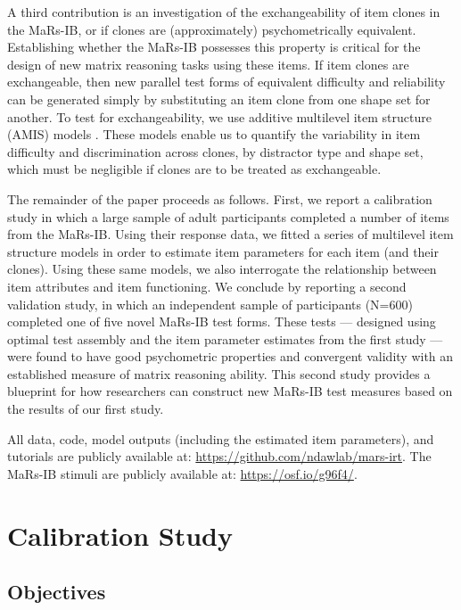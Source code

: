 \documentclass[a4paper,man,natbib,noextraspace]{apa6}
\begin{document}
A third contribution is an investigation of the exchangeability of item clones in the MaRs-IB, or if clones are (approximately) psychometrically equivalent. Establishing whether the MaRs-IB possesses this property is critical for the design of new matrix reasoning tasks using these items. If item clones are exchangeable, then new parallel test forms of equivalent difficulty and reliability can be generated simply by substituting an item clone from one shape set for another. To test for exchangeability, we use additive multilevel item structure (AMIS) models \citep{geerlings2011modeling, cho2014additive, lathrop2017item}. These models enable us to quantify the variability in item difficulty and discrimination across clones, by distractor type and shape set, which must be negligible if clones are to be treated as exchangeable. 

The remainder of the paper proceeds as follows. First, we report a calibration study in which a large sample of adult participants completed a number of items from the MaRs-IB. Using their response data, we fitted a series of multilevel item structure models in order to estimate item parameters for each item (and their clones). Using these same models, we also interrogate the relationship between item attributes and item functioning. We conclude by reporting a second validation study, in which an independent sample of participants (N=600) completed one of five novel MaRs-IB test forms. These tests --- designed using optimal test assembly and the item parameter estimates from the first study --- were found to have good psychometric properties and convergent validity with an established measure of matrix reasoning ability. This second study provides a blueprint for how researchers can construct new MaRs-IB test measures based on the results of our first study.

All data, code, model outputs (including the estimated item parameters), and tutorials are publicly available at: \url{https://github.com/ndawlab/mars-irt}. The MaRs-IB stimuli are publicly available at: \url{https://osf.io/g96f4/}.

\section{Calibration Study}

\subsection{Objectives}
\end{document}

